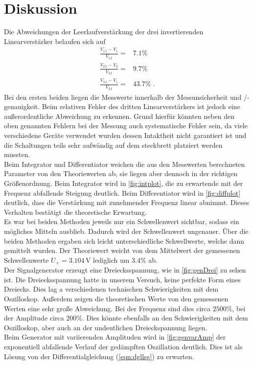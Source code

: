 \section{Diskussion}
\label{sec:Diskussion}
Die Abweichungen der Leerlaufverstärkung der drei invertierenden Linearverstärker belaufen sich auf 
\begin{align*}
    \frac{V_{1\text{,t}}-V_1}{V_{1\text{,t}}}=&7.1\%\\
    \frac{V_{2\text{,t}}-V_2}{V_{2\text{,t}}}=&9.7\%\\
    \frac{V_{3\text{,t}}-V_1}{V_{3\text{,t}}}=&43.7\%\; .
\end{align*}
Bei den ersten beiden liegen die Messwerte innerhalb der Messunsicherheit und /-genauigkeit. Beim relativen Fehler des dritten Linearverstärkers ist jedoch eine außerordentliche Abweichung zu erkennen.
Grund hierfür könnten neben den oben genannten Fehlern bei der Messung auch systematische Fehler sein, da viele verschiedene Geräte verwendet wurden dessen Intaktheit nicht garantiert ist und die Schaltungen teils sehr aufwändig 
auf dem steckbrett platziert werden mussten.
\\
Beim Integrator und Differentiator weichen die aus den Messwerten berechneten Parameter von den Theoriewerten ab, sie liegen aber dennoch 
in der richtigen Größenordnung. Beim Integrator wird in \autoref{fig:intplot}, die zu erwartende mit der Frequenz abfallende Steigung deutlich. 
Beim Differentiator wird in \autoref{fig:diffplot} deutlich, dass die Verstärkung mit zunehmender Frequenz linear 
abnimmt. Dieses Verhalten bestätigt die theoretische Erwartung.
\\
Es war bei beiden Methoden jeweils nur ein Schwellenwert sichtbar, sodass ein mögliches Mitteln ausblieb. Dadurch wird 
der Schwellenwert ungenauer. Über die beiden Methoden ergaben sich leicht unterschiedliche Schwellwerte, welche dann gemittelt wurden. Der Theoriewert weicht von dem Mittelwert der gemessenen Schwellenwerte $U_+ = 3.104\,\unit{\volt}$ 
lediglich um $3.4\%$ ab.
\\
Der Signalgenerator erzeugt eine Dreiecksspannung, wie in \autoref{fig:genDrei} zu sehen ist. Die Dreiecksspannung hatte in unserem Versuch, 
keine perfekte Form eines Dreiecks. Dies lag a verschiedenen technischen Schwierigkeiten mit dem Oszilloskop. Außerdem zeigen die theoretischen Werte 
von den gemessenen Werten eine sehr große Abweichung. Bei der Frequenz sind dies circa $2500\%$, bei der Amplitude circa $200\%$. Dies könnte ebenfalls 
an den Schwierigkeiten mit dem Oszilloskop, aber auch an der undeutlichen Dreieckspannung liegen.
\\
Beim Generator mit variierenden Amplituden wird in \autoref{fig:genvarAmp} der exponentiell abfallende Verlauf der gedämpften Oszillation 
deutlich. Dies ist als Lösung von der Differentialgleichung (\autoref{eqn:dgllsg}) zu erwarten.